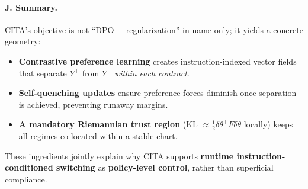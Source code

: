 \paragraph{\textbf{J. Summary.}}
CITA’s objective is not ``DPO + regularization'' in name only; it yields a concrete geometry:
\begin{itemize}
\item \textbf{Contrastive preference learning} creates instruction-indexed vector fields that separate $Y^+$ from $Y^-$ \emph{within each contract}.
\item \textbf{Self-quenching updates} ensure preference forces diminish once separation is achieved, preventing runaway margins.
\item \textbf{A mandatory Riemannian trust region} (KL $\approx \tfrac12\delta\theta^\top F\delta\theta$ locally) keeps all regimes co-located within a stable chart.
\end{itemize}
These ingredients jointly explain why CITA supports \textbf{runtime instruction-conditioned switching} as \textbf{policy-level control}, rather than superficial compliance.
